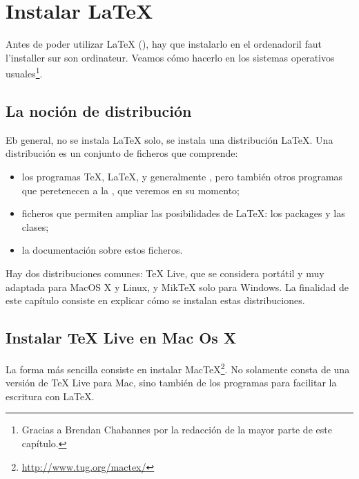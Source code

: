 \chapter {Instalar \LaTeX{}}\label{install}

\begin{intro}
    Antes de poder utilizar \LaTeX{} (\XeLaTeX), hay que instalarlo en el ordenadoril faut l'installer sur son ordinateur. Veamos cómo hacerlo en los sistemas operativos usuales\footnote{Gracias a Brendan Chabannes por la redacción de la mayor parte de este capítulo.}.
\end{intro}

\section{La noción de distribución}

Eb general, no se instala \LaTeX{} solo, se instala una distribución \LaTeX{}. Una distribución es un conjunto de ficheros que comprende: 
\begin{itemize}
\item los programas \TeX, \LaTeX, y generalmente \XeLaTeX, pero también otros programas que peretenecen  a la  , que veremos en su momento;
\item ficheros que permiten ampliar las posibilidades de \LaTeX{}: los packages y las clases;
\item la documentación sobre estos ficheros.
\end{itemize}

Hay dos distribuciones comunes: TeX Live, que se considera portátil y muy adaptada para MacOS X y Linux, y MikTeX solo para Windows. La finalidad de este capítulo consiste en explicar cómo se instalan estas distribuciones.

\section{Instalar TeX Live en Mac Os X}

La forma más sencilla consiste en instalar MacTeX\footnote{\url{http://www.tug.org/mactex/}}. No solamente consta de una versión de TeX Live para Mac, sino también de los programas para facilitar la escritura con \LaTeX{}.

